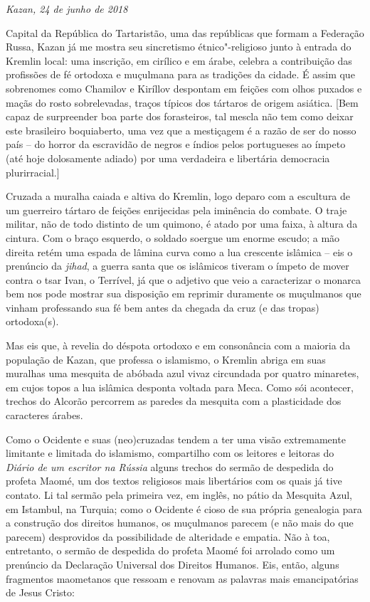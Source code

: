 \begin{flushright}
\emph{Kazan, 24 de junho de 2018}
\end{flushright}

Capital da República do Tartaristão, uma das repúblicas que formam a
Federação Russa, Kazan já me mostra seu sincretismo étnico"-religioso
junto à entrada do Kremlin local: uma inscrição, em cirílico e em árabe,
celebra a contribuição das profissões de fé ortodoxa e muçulmana para as
tradições da cidade. É assim que sobrenomes como Chamilov e Kiríllov
despontam em feições com olhos puxados e maçãs do rosto sobrelevadas,
traços típicos dos tártaros de origem asiática. {[}Bem capaz de
surpreender boa parte dos forasteiros, tal mescla não tem como deixar
este brasileiro boquiaberto, uma vez que a mestiçagem é a razão de ser
do nosso país -- do horror da escravidão de negros e índios pelos
portugueses ao ímpeto (até hoje dolosamente adiado) por uma verdadeira e
libertária democracia plurirracial.{]}

Cruzada a muralha caiada e altiva do Kremlin, logo deparo com a
escultura de um guerreiro tártaro de feições enrijecidas pela iminência
do combate. O traje militar, não de todo distinto de um quimono, é atado
por uma faixa, à altura da cintura. Com o braço esquerdo, o soldado
soergue um enorme escudo; a mão direita retém uma espada de lâmina curva
como a lua crescente islâmica -- eis o prenúncio da \emph{jihad}, a
guerra santa que os islâmicos tiveram o ímpeto de mover contra o tsar
Ivan, o Terrível, já que o adjetivo que veio a caracterizar o monarca
bem nos pode mostrar sua disposição em reprimir duramente os muçulmanos
que vinham professando sua fé bem antes da chegada da cruz (e das
tropas) ortodoxa(s).

Mas eis que, à revelia do déspota ortodoxo e em consonância com a
maioria da população de Kazan, que professa o islamismo, o Kremlin
abriga em suas muralhas uma mesquita de abóbada azul vivaz circundada
por quatro minaretes, em cujos topos a lua islâmica desponta voltada
para Meca. Como sói acontecer, trechos do Alcorão percorrem as paredes
da mesquita com a plasticidade dos caracteres árabes.

Como o Ocidente e suas (neo)cruzadas tendem a ter uma visão extremamente
limitante e limitada do islamismo, compartilho com os leitores e
leitoras do \emph{Diário de um escritor na Rússia} alguns trechos do
sermão de despedida do profeta Maomé, um dos textos religiosos mais
libertários com os quais já tive contato. Li tal sermão pela primeira
vez, em inglês, no pátio da Mesquita Azul, em Istambul, na Turquia; como
o Ocidente é cioso de sua própria genealogia para a construção dos
direitos humanos, os muçulmanos parecem (e não mais do que parecem)
desprovidos da possibilidade de alteridade e empatia. Não à toa,
entretanto, o sermão de despedida do profeta Maomé foi arrolado como um
prenúncio da Declaração Universal dos Direitos Humanos. Eis, então,
alguns fragmentos maometanos que ressoam e renovam as palavras mais
emancipatórias de Jesus Cristo:

